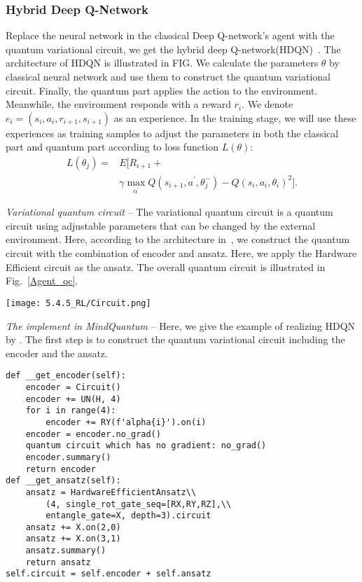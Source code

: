 \subsubsection{Hybrid Deep Q-Network}

Replace the neural network in the classical Deep Q-network's agent with the quantum variational circuit, we get the hybrid deep Q-network(HDQN)~\cite{Q_rl}. The architecture of HDQN is illustrated in FIG. We calculate the parameters $\theta$ by classical neural network and use them to construct the quantum variational circuit. Finally, the quantum part applies the action to the environment. Meanwhile, the environment responds with a reward $r_i$. We denote $e_i=(s_i,a_i,r_{i+1},s_{i+1})$ as an experience. In the training stage, we will use these experiences as training samples to adjust the parameters in both the classical part and quantum part according to loss function $L(\theta)$:
\begin{equation}
\begin{split}
    L(\theta_{j})=&E[R_{i+1}+\\
    &\gamma \max_{\alpha^{'}}Q(s_{i+1},a^{'},\theta_{j}^{-})-Q(s_{i},a_{i},\theta_{i})^2].
\end{split}
\label{loss func}
\end{equation}

\textit{Variational quantum circuit} -- The variational quantum circuit is a quantum circuit using adjustable parameters that can be changed by the external environment. Here, according to the architecture in~\cite{Q_rl}, we construct the quantum circuit with the combination of encoder and ansatz. Here, we apply the Hardware Efficient circuit as the ansatz. The overall quantum circuit is illustrated in Fig.~\ref{Agent_qc}.

\begin{figure*}[ht]
  \centering
  \texttt{[image: 5.4.5\_RL/Circuit.png]}
  \caption{\label{Agent_qc} The overall quantum circuit of agent in RL.}
\end{figure*}

\textit{The implement in MindQuantum} -- Here, we give the example of realizing HDQN by \MindQuantum. The first step is to construct the quantum variational circuit including the encoder and the ansatz.
\begin{lstlisting}
def __get_encoder(self):
    encoder = Circuit()
    encoder += UN(H, 4)
    for i in range(4):
        encoder += RY(f'alpha{i}').on(i)
    encoder = encoder.no_grad()
    quantum circuit which has no gradient: no_grad()
    encoder.summary()
    return encoder
def __get_ansatz(self):
    ansatz = HardwareEfficientAnsatz\\
        (4, single_rot_gate_seq=[RX,RY,RZ],\\
        entangle_gate=X, depth=3).circuit
    ansatz += X.on(2,0)
    ansatz += X.on(3,1)
    ansatz.summary()
    return ansatz
self.circuit = self.encoder + self.ansatz
\end{lstlisting}


